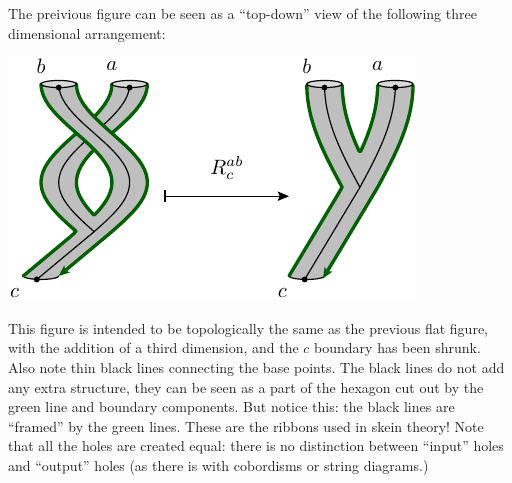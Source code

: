 \documentclass[aps, prl, letterpaper, twocolumn, superscriptaddress, notitlepage, 10pt]{revtex4-1}
\begin{document}
The preivious figure can be seen as a ``top-down'' view of the
following three dimensional arrangement:
\begin{center}
\includegraphics[]{pic-rmove-skein.pdf}
\end{center}
This figure is intended to be topologically
the same as the previous flat figure,
with the addition of a third dimension,
and the $c$ boundary has been shrunk.
Also note thin black lines
connecting the base points.
The black lines do not add any extra structure, they can
be seen as a part of the hexagon cut out by
the green line and boundary components.
But notice this: the black lines are ``framed'' by the green lines. 
These are the ribbons used in skein theory!
Note that all the holes are created equal: there is
no distinction between ``input'' holes and ``output'' holes
(as there is with cobordisms or string diagrams.)

\end{document}
